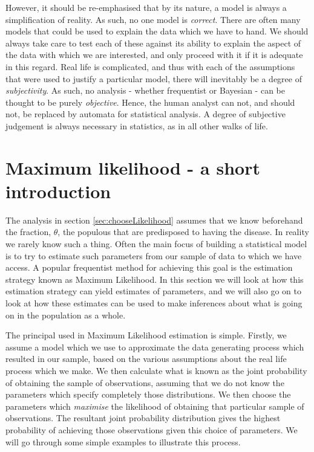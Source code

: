 \documentclass[11pt,fullpage]{book}
\begin{document}
However, it should be re-emphasised that by its nature, a model is always a simplification of reality. As such, no one model is \textit{correct}. There are often many models that could be used to explain the data which we have to hand. We should always take care to test each of these against its ability to explain the aspect of the data with which we are interested, and only proceed with it if it is adequate in this regard. Real life is complicated, and thus with each of the assumptions that were used to justify a particular model, there will inevitably be a degree of \textit{subjectivity}. As such, no analysis - whether frequentist or Bayesian - can be thought to be purely \textit{objective}. Hence, the human analyst can not, and should not, be replaced by automata for statistical analysis. A degree of subjective judgement is always necessary in statistics, as in all other walks of life.

\section{Maximum likelihood - a short introduction}\label{sec:Likelihood_MLE}
The analysis in section \ref{sec:chooseLikelihood} assumes that we know beforehand the fraction, $\theta$, the populous that are predisposed to having the disease. In reality we rarely know such a thing. Often the main focus of building a statistical model is to try to estimate such parameters from our sample of data to which we have access. A popular frequentist method for achieving this goal is the estimation strategy known as Maximum Likelihood. In this section we will look at how this estimation strategy can yield estimates of parameters, and we will also go on to look at how these estimates can be used to make inferences about what is going on in the population as a whole.

The principal used in Maximum Likelihood estimation is simple. Firstly, we assume a model which we use to approximate the data generating process which resulted in our sample, based on the various assumptions about the real life process which we make. We then calculate what is known as the joint probability of obtaining the sample of observations, assuming that we do not know the parameters which specify completely those distributions. We then choose the parameters which \textit{maximise} the likelihood of obtaining that particular sample of observations. The resultant joint probability distribution gives the highest probability of achieving those observations given this choice of parameters. We will go through some simple examples to illustrate this process. 
\end{document}

